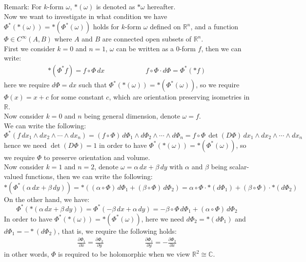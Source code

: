 \documentclass[15pt]{book}
\theoremstyle{break}
\theoremstyle{break}
\newcommand{\R}{\mathbb{R}}
\newcommand{\Complex}{\mathbb{C}}
\newcommand{\remark}{\color{blue}Remark: \color{black}}
\begin{document}
\remark For $k$-form $\omega$, $*(\omega)$ is denoted as $*\omega$ hereafter. \\

Now we want to investigate in what condition we have $\Phi^*(*(\omega)) = *(\Phi^*(\omega))$ holds for $k$-form $\omega$ defined on $\R^n$, and a function $\Phi\in C^\infty(A, B)$ where $A$ and $B$ are connected open subsets of $\R^n$. \\

First we consider $k=0$ and $n=1$, $\omega$ can be written as a $0$-form $f$, then we can write:
\begin{align*}
*(\Phi^*f)=f\circ \Phi\, dx      \qquad\qquad\qquad    f\circ \Phi \cdot d\Phi = \Phi^*(*f)
\end{align*}
here we require $d\Phi = dx$ such that $\Phi^*(*(\omega)) = *(\Phi^*(\omega))$, so we require $\Phi(x) = x+c$ for some constant $c$, which are orientation preserving isometries in $\R$.\\

Now consider $k=0$ and $n$ being general dimension, denote $\omega = f$. \\
We can write the following: 
$$\Phi^*(f\, dx_1 \wedge dx_2 \wedge \cdots \wedge dx_n) = (f\circ \Phi)\, d\Phi_1 \wedge d\Phi_2 \wedge \cdots \wedge d\Phi_n = f\circ \Phi \,\det(D\Phi) \, dx_1 \wedge dx_2 \wedge \cdots \wedge dx_n$$ 
hence we need $\det(D\Phi) = 1$ in order to have $\Phi^*(*(\omega)) = *(\Phi^*(\omega))$, so we require $\Phi$ to preserve orientation and volume.\\

Now consider $k=1$ and $n=2$, denote $\omega = \alpha \, dx + \beta \, dy$ with $\alpha$ and $\beta$ being scalar-valued functions, then we can write the following: $$*(\Phi^*(\alpha\, dx + \beta \, dy)) = *((\alpha\circ \Phi)\, d\Phi_1 + (\beta \circ \Phi)\, d\Phi_2) = \alpha \circ \Phi \cdot *(d\Phi_1) + (\beta \circ \Phi) \cdot *(d\Phi_2)$$
On the other hand, we have:
$$\Phi^*(*(\alpha\, dx +\beta \, dy) ) = \Phi^*(-\beta \, dx+\alpha\, dy) = -\beta \circ \Phi \, d\Phi_1 + (\alpha \circ \Phi)\, d\Phi_2$$
In order to have  $\Phi^*(*(\omega)) = *(\Phi^*(\omega))$, here we need $d\Phi_2 = *(d\Phi_1)$ and $d\Phi_1 = -*(d\Phi_2)$, that is, we require the following holds:
\begin{align*}
\frac{\partial\Phi_1}{\partial x} = \frac{\partial \Phi_2}{\partial y} \qquad\qquad\qquad \frac{\partial \Phi_1}{\partial y} = -\frac{\partial \Phi_2}{\partial x}
\end{align*}
in other words, $\Phi$ is required to be holomorphic when we view $\R^2  \cong \Complex$.\\
\end{document}
